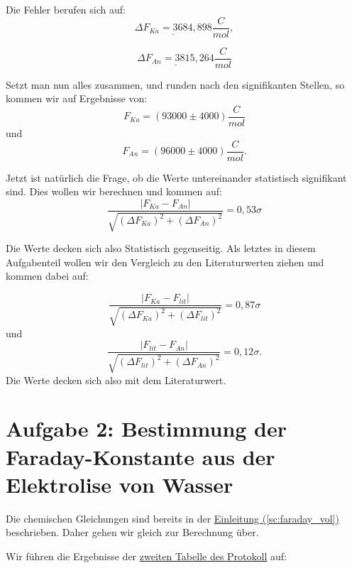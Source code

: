 Die Fehler berufen sich auf:
\begin{equation}
    \underline{\Delta F_{Ka} = 3684,898} \frac{C}{mol},
\end{equation}

\begin{equation}
    \underline{\Delta F_{An} = 3815,264} \frac{C}{mol}
\end{equation}


Setzt man nun alles zusammen, und runden nach den signifikanten Stellen, so kommen wir auf Ergebnisse von:
\begin{equation}
    \boxed{
        F_{Ka} = (93000 \pm 4000) \frac{C}{mol}
    }
\end{equation}
und
\begin{equation}
    \boxed{
        F_{An} = (96000 \pm 4000) \frac{C}{mol}.
    }
\end{equation}

Jetzt ist natürlich die Frage, ob die Werte untereinander statistisch signifikant sind. Dies wollen wir berechnen und kommen auf:
\begin{equation}
    \frac{\left| F_{Ka} - F_{An} \right|}{\sqrt{(\Delta F_{Ka})^2 + (\Delta F_{An})^2} } = 0,53\sigma
\end{equation}

Die Werte decken sich also Statistisch gegenseitig. 
Als letztes in diesem Aufgabenteil wollen wir den Vergleich zu den Literaturwerten ziehen und kommen dabei auf:

\begin{equation}
    \frac{\left| F_{Ka} - F_{lit} \right|}{\sqrt{(\Delta F_{Ka})^2 + (\Delta F_{lit})^2} } = 0,87\sigma
\end{equation}
und
\begin{equation}
    \frac{\left| F_{lit} - F_{An} \right|}{\sqrt{(\Delta F_{lit})^2 + (\Delta F_{An})^2} } = 0,12\sigma.
\end{equation}
Die Werte decken sich also mit dem Literaturwert.

\section{Aufgabe 2: Bestimmung der Faraday-Konstante aus der Elektrolise von Wasser}
Die chemischen Gleichungen sind bereits in der \hyperref[sc:faraday_vol]{Einleitung (\ref*{sc:faraday_vol})} beschrieben. Daher gehen wir gleich zur Berechnung über.


Wir führen die Ergebnisse der \hyperref[Protokoll]{zweiten Tabelle des Protokoll} auf:











